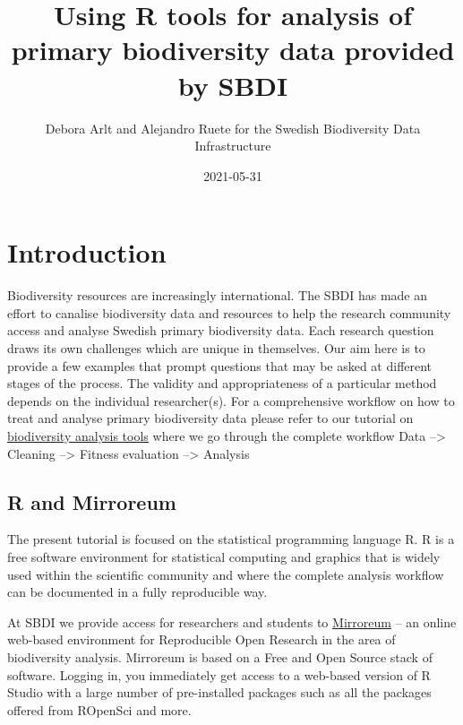 \documentclass[
  10pt,
]{article}
\title{Using R tools for analysis of primary biodiversity data provided by SBDI}
\author{Debora Arlt and Alejandro Ruete for the Swedish Biodiversity Data Infrastructure}
\date{2021-05-31}
\begin{document}
\maketitle

{
\hypersetup{linkcolor=}
\setcounter{tocdepth}{2}
\tableofcontents
}
\hypertarget{introduction}{%
\section*{Introduction}\label{introduction}}

Biodiversity resources are increasingly international. The SBDI has made an effort to canalise biodiversity data and resources to help the research community access and analyse Swedish primary biodiversity data. Each research question draws its own challenges which are unique in themselves. Our aim here is to provide a few examples that prompt questions that may be asked at different stages of the process. The validity and appropriateness of a particular method depends on the individual researcher(s). For a comprehensive workflow on how to treat and analyse primary biodiversity data please refer to our tutorial on \href{https://github.com/biodiversitydata-se/biodiversity-analysis-tools}{biodiversity analysis tools} where we go through the complete workflow Data --\textgreater{} Cleaning --\textgreater{} Fitness evaluation --\textgreater{} Analysis

\hypertarget{r-and-mirroreum}{%
\subsection*{R and Mirroreum}\label{r-and-mirroreum}}

The present tutorial is focused on the statistical programming language R. R is a free software environment for statistical computing and graphics that is widely used within the scientific community and where the complete analysis workflow can be documented in a fully reproducible way.

At SBDI we provide access for researchers and students to \href{https://mirroreum.biodiversitydata.se/}{Mirroreum} -- an online web-based environment for Reproducible Open Research in the area of biodiversity analysis. Mirroreum is based on a Free and Open Source stack of software. Logging in, you immediately get access to a web-based version of R Studio with a large number of pre-installed packages such as all the packages offered from ROpenSci and more.
\end{document}
